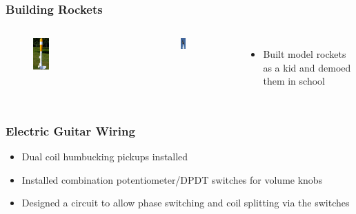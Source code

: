 \documentclass[aspectratio=169]{beamer}
\begin{document}
\begin{frame}
  \frametitle{Building Rockets}
  \begin{columns}[c]
    \begin{figure}
      \includegraphics[width=0.2\textwidth]{1996_eggspress_zps43246419.jpg}
    \end{figure}

    \begin{figure}
      \includegraphics[width=0.2\textwidth]{SR71.jpeg}
    \end{figure}
    
    \begin{itemize}
    \item Built model rockets as a kid and demoed them in school
    \end{itemize}
  \end{columns}
\end{frame}

\begin{frame}
  \frametitle{Electric Guitar Wiring}
  \begin{itemize}
  \item Dual coil humbucking pickups installed
  \item Installed combination potentiometer/DPDT switches for volume
    knobs
  \item Designed a circuit to allow phase switching and coil splitting
    via the switches
  \end{itemize}
\end{frame}
\end{document}
